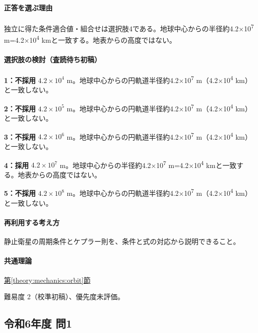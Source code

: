 \paragraph{正答を選ぶ理由} 独立に得た条件適合値・組合せは選択肢4である。地球中心からの半径約4.2×10\textsuperscript{7} m=\allowbreak{}4.2×10\textsuperscript{4} kmと一致する。地表からの高度ではない。

\paragraph{選択肢の検討（査読待ち初稿）}\mbox{}\par

\noindent\textbf{1：不採用} \(4.2\times10^4\) m。地球中心からの円軌道半径約4.2×10\textsuperscript{7} m（4.2×10\textsuperscript{4} km）と一致しない。\par

\noindent\textbf{2：不採用} \(4.2\times10^5\) m。地球中心からの円軌道半径約4.2×10\textsuperscript{7} m（4.2×10\textsuperscript{4} km）と一致しない。\par

\noindent\textbf{3：不採用} \(4.2\times10^6\) m。地球中心からの円軌道半径約4.2×10\textsuperscript{7} m（4.2×10\textsuperscript{4} km）と一致しない。\par

\noindent\textbf{4：採用} \(4.2\times10^7\) m。地球中心からの半径約4.2×10\textsuperscript{7} m=\allowbreak{}4.2×10\textsuperscript{4} kmと一致する。地表からの高度ではない。\par

\noindent\textbf{5：不採用} \(4.2\times10^8\) m。地球中心からの円軌道半径約4.2×10\textsuperscript{7} m（4.2×10\textsuperscript{4} km）と一致しない。\par

\paragraph{再利用する考え方} 静止衛星の周期条件とケプラー則を、条件と式の対応から説明できること。

\paragraph{共通理論} \hyperref[theory:mechanics:orbit]{第\ref*{theory:mechanics:orbit}節}

\par 難易度 2（校準初稿）、優先度未評価。

\subsection{令和6年度 問1}
\label{q:r06-reg-applied-01}

